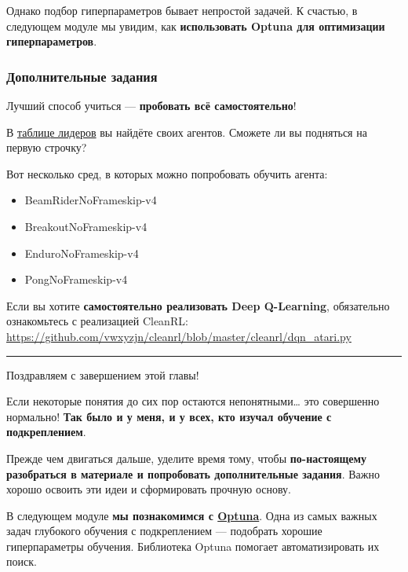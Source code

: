 \documentclass[11pt,a4paper]{article}
\begin{document}
Однако подбор гиперпараметров бывает непростой задачей. К счастью, в следующем модуле мы увидим, как \textbf{использовать Optuna для оптимизации гиперпараметров}.

\subsubsection{Дополнительные задания}\label{some-additional-challenges}

Лучший способ учиться --- \textbf{пробовать всё самостоятельно}!

В \href{https://huggingface.co/spaces/huggingface-projects/Deep-Reinforcement-Learning-Leaderboard}{таблице лидеров} вы найдёте своих агентов. Сможете ли вы подняться на первую строчку?

Вот несколько сред, в которых можно попробовать обучить агента:

\begin{itemize}
\tightlist
\item
BeamRiderNoFrameskip-v4
\item
BreakoutNoFrameskip-v4
\item
EnduroNoFrameskip-v4
\item
PongNoFrameskip-v4
\end{itemize}

Если вы хотите \textbf{самостоятельно реализовать Deep Q-Learning}, обязательно ознакомьтесь с реализацией CleanRL: \url{https://github.com/vwxyzjn/cleanrl/blob/master/cleanrl/dqn_atari.py}


\begin{center}\rule{0.5\linewidth}{0.5pt}\end{center}

Поздравляем с завершением этой главы!

Если некоторые понятия до сих пор остаются непонятными\ldots{} это совершенно нормально! \textbf{Так было и у меня, и у всех, кто изучал обучение с подкреплением}.

Прежде чем двигаться дальше, уделите время тому, чтобы \textbf{по-настоящему разобраться в материале и попробовать дополнительные задания}. Важно хорошо освоить эти идеи и сформировать прочную основу.

В следующем модуле \textbf{мы познакомимся с \href{https://optuna.org/}{Optuna}}. Одна из самых важных задач глубокого обучения с подкреплением --- подобрать хорошие гиперпараметры обучения. Библиотека Optuna помогает автоматизировать их поиск.
\end{document}
